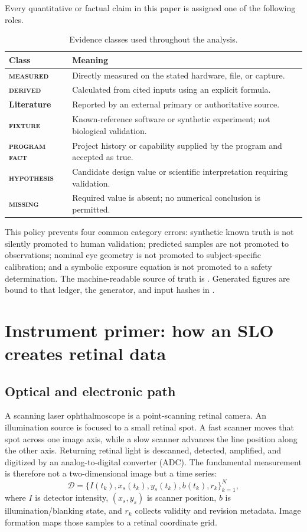 \documentclass[11pt]{article}
\newcommand{\missing}{\textsc{\color{Red}missing}}
\newcommand{\hypothesis}{\textsc{\color{Red}hypothesis}}
\newcommand{\fixture}{\textsc{\color{Amber}fixture}}
\newcommand{\measured}{\textsc{\color{Teal}measured}}
\newcommand{\derived}{\textsc{\color{Blue}derived}}
\newcommand{\programfact}{\textsc{\color{Navy}program fact}}
\begin{document}
Every quantitative or factual claim in this paper is assigned one of the following roles.

\begin{table}[ht]
\centering
\caption{Evidence classes used throughout the analysis.}
\begin{tabularx}{\textwidth}{>{\bfseries}p{} X}
\toprule
Class & Meaning\\
\midrule
\measured & Directly measured on the stated hardware, file, or capture.\\
\derived & Calculated from cited inputs using an explicit formula.\\
Literature & Reported by an external primary or authoritative source.\\
\fixture & Known-reference software or synthetic experiment; not biological validation.\\
\programfact & Project history or capability supplied by the program and accepted as true.\\
\hypothesis & Candidate design value or scientific interpretation requiring validation.\\
\missing & Required value is absent; no numerical conclusion is permitted.\\
\bottomrule
\end{tabularx}
\end{table}

This policy prevents four common category errors: synthetic known truth is not silently promoted to
human validation; predicted samples are not promoted to observations; nominal eye geometry is not
promoted to subject-specific calibration; and a symbolic exposure equation is not promoted to a
safety determination. The machine-readable source of truth is
. Generated figures are bound to that ledger, the generator,
and input hashes in .

\section{Instrument primer: how an SLO creates retinal data}

\subsection{Optical and electronic path}

A scanning laser ophthalmoscope is a point-scanning retinal camera. An illumination source is
focused to a small retinal spot. A fast scanner moves that spot across one image axis, while a slow
scanner advances the line position along the other axis. Returning retinal light is descanned,
detected, amplified, and digitized by an analog-to-digital converter (ADC). The fundamental
measurement is therefore not a two-dimensional image but a time series:
\[
  \mathcal D = \{I(t_k), x_s(t_k), y_s(t_k), b(t_k), r_k\}_{k=1}^{N},
\]
where $I$ is detector intensity, $(x_s,y_s)$ is scanner position, $b$ is illumination/blanking
state, and $r_k$ collects validity and revision metadata. Image formation maps those samples to a
retinal coordinate grid.
\end{document}
